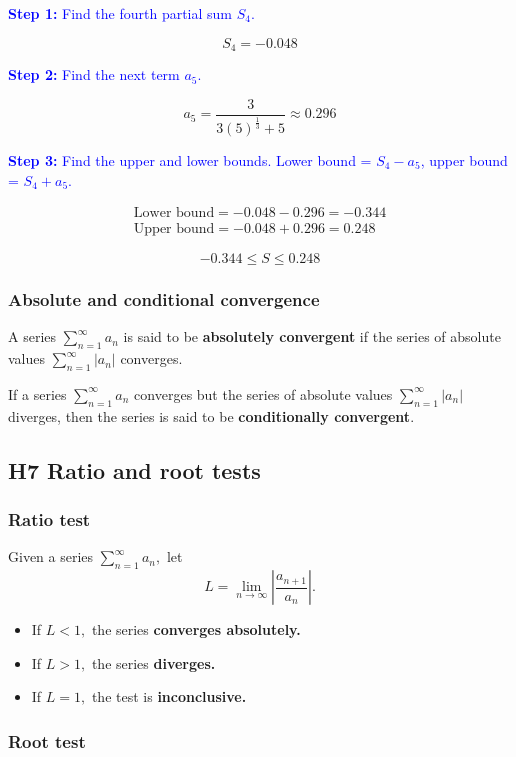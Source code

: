 \documentclass[letterpaper, 12pt]{article}
\newcommand{\step}[2]{\textcolor{blue}{\textbf{Step #1:} #2}}
\begin{document}
\step{1}{Find the fourth partial sum $S_4$.}

$$S_4 = -0.048$$

\step{2}{Find the next term $a_5$.}

$$a_5 = \frac{3}{3(5)^{\frac{1}{3}} + 5} \approx 0.296$$

\step{3}{Find the upper and lower bounds. Lower bound = $S_4 - a_5$, upper bound = $S_4 + a_5$.}

\begin{gather*}
\text{Lower bound} = -0.048 - 0.296 = -0.344 \\
\text{Upper bound} = -0.048 + 0.296 = 0.248
\end{gather*}

$$\boxed{-0.344 \leq S \leq 0.248}$$

\subsubsection*{Absolute and conditional convergence}

A series $\displaystyle \sum_{n=1}^\infty a_n$ is said to be \textbf{absolutely convergent} if the series of absolute values $\displaystyle \sum_{n=1}^\infty |a_n|$ converges.

If a series $\displaystyle \sum_{n=1}^\infty a_n$ converges but the series of absolute values $\displaystyle \sum_{n=1}^\infty |a_n|$ diverges, then the series is said to be \textbf{conditionally convergent}.

\subsection*{H7 Ratio and root tests}

\subsubsection*{Ratio test}
Given a series $\displaystyle \sum_{n=1}^\infty a_n,$ let
$$L = \lim_{n \to \infty} \left| \frac{a_{n+1}}{a_n} \right|.$$
\begin{itemize}
    \item If $L < 1,$ the series \textbf{converges absolutely.}
    \item If $L > 1,$ the series \textbf{diverges.}
    \item If $L = 1,$ the test is \textbf{inconclusive.}
\end{itemize}

\subsubsection*{Root test}
\end{document}
